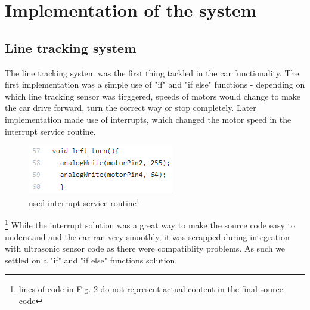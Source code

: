 \documentclass[conference]{IEEEtran}
\begin{document}
\section{Implementation of the system}
\subsection{Line tracking system}
The line tracking system was the first thing tackled in the car functionality. The first implementation was a simple use of "if" and "if else" functions - depending on which line tracking sensor was tirggered, speeds of motors would change to make the car drive forward, turn the correct way or stop completely. Later implementation made use of interrupts, which changed the motor speed in the interrupt service routine.
\begin{figure}[h!]
	\includegraphics[width=\linewidth]{examplecode1.png}
	\caption{used interrupt service routine$^{1}$}
	\label{fig:EXC1}
\end{figure}
\footnote{lines of code in Fig. 2 do not represent actual content in the final source code}
While the interrupt solution was a great way to make the source code easy to understand and the car ran very smoothly, it was scrapped during integration with ultrasonic sensor code as there were compatiblity problems. As such we settled on a "if" and "if else" functions solution.
\end{document}
